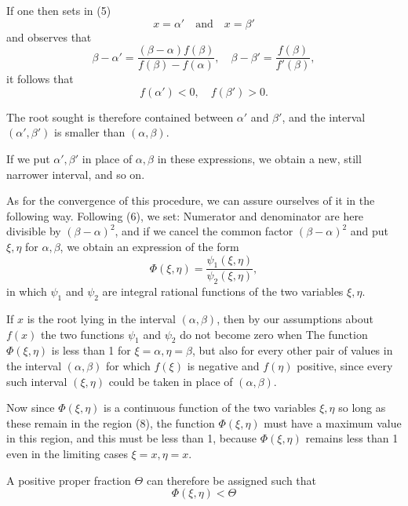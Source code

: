 
If one then sets in (5)
\[
x = \alpha' \quad \text{and} \quad x = \beta'
\]
and observes that
\[
\beta - \alpha' = \frac{(\beta - \alpha)f(\beta)}{f(\beta) - f(\alpha)}, \quad \beta - \beta' = \frac{f(\beta)}{f'(\beta)},
\]
it follows that
\[
f(\alpha') < 0, \quad f(\beta') > 0.
\]

The root sought is therefore contained between $\alpha'$ and $\beta'$,
and the interval $(\alpha', \beta')$ is smaller than $(\alpha, \beta)$.

If we put $\alpha', \beta'$ in place of $\alpha, \beta$ in these expressions,
we obtain a new, still narrower interval, and so on.

As for the convergence of this procedure, we can assure
ourselves of it in the following way. Following (6), we set:
Numerator and denominator are here divisible by $(\beta - \alpha)^2$, and
if we cancel the common factor $(\beta - \alpha)^2$ and put $\xi, \eta$
for $\alpha, \beta$, we obtain an expression of the form
\[
\Phi(\xi, \eta) = \frac{\psi_1(\xi, \eta)}{\psi_2(\xi, \eta)},
\]
in which $\psi_1$ and $\psi_2$ are integral rational functions of the two variables
$\xi, \eta$.

If $x$ is the root lying in the interval $(\alpha, \beta)$, then by our
assumptions about $f(x)$ the two functions $\psi_1$ and $\psi_2$
do not become zero when
The function $\Phi(\xi, \eta)$ is less than 1 for $\xi = \alpha, \eta = \beta$, but also for
every other pair of values in the interval $(\alpha, \beta)$ for which $f(\xi)$
is negative and $f(\eta)$ positive, since every such interval
$(\xi, \eta)$ could be taken in place of $(\alpha, \beta)$.

Now since $\Phi(\xi, \eta)$ is a continuous function of the two variables
$\xi, \eta$ so long as these remain in the region (8), the
function $\Phi(\xi, \eta)$ must have a maximum value in this region,
and this must be less than 1, because $\Phi(\xi, \eta)$
remains less than 1 even in the limiting cases $\xi = x, \eta = x$.

A positive proper fraction $\Theta$ can therefore be assigned
such that
\[
\Phi(\xi, \eta) < \Theta
\]
